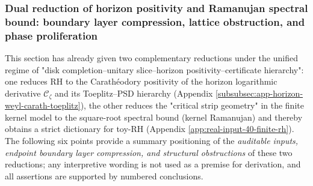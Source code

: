 \subsubsection{Dual reduction of horizon positivity and Ramanujan spectral bound: boundary layer compression, lattice obstruction, and phase proliferation}\label{subsubsec:xi-horizon-ramanujan-feasible-reduction}
This section has already given two complementary reductions under the unified regime of "disk completion--unitary slice--horizon positivity--certificate hierarchy":
one reduces RH to the Carath\'eodory positivity of the horizon logarithmic derivative \(\mathscr{C}_{\zeta}\) and its Toeplitz--PSD hierarchy (Appendix \ref{subsubsec:app-horizon-weyl-carath-toeplitz}), the other reduces the "critical strip geometry" in the finite kernel model to the square-root spectral bound (kernel Ramanujan) and thereby obtains a strict dictionary for toy-RH (Appendix \ref{app:real-input-40-finite-rh}).
The following six points provide a summary positioning of the \emph{auditable inputs, endpoint boundary layer compression, and structural obstructions} of these two reductions; any interpretive wording is not used as a premise for derivation, and all assertions are supported by numbered conclusions.

